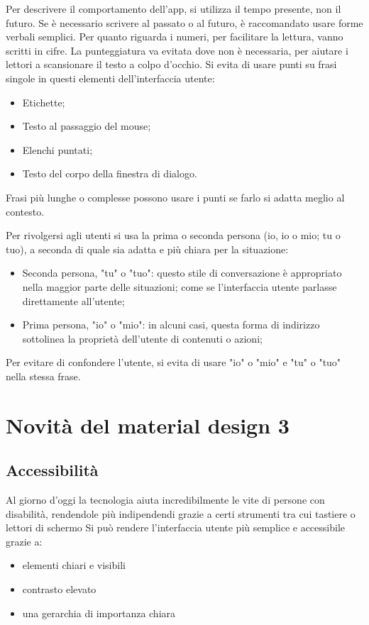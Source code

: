 \documentclass[12pt, a4paper]{report}
\begin{document}
	Per descrivere il comportamento dell’app, si utilizza il tempo presente, non il futuro. Se è necessario scrivere al passato o al futuro, è raccomandato usare forme verbali semplici. Per quanto riguarda i numeri,  per facilitare la lettura, vanno scritti in cifre.
	La punteggiatura va evitata dove non è necessaria, per aiutare i lettori a scansionare il testo a colpo d'occhio. Si evita di usare punti su frasi singole in questi elementi dell'interfaccia utente:
	\begin{itemize}
		\item Etichette;
		\item Testo al passaggio del mouse;
		\item Elenchi puntati;
		\item Testo del corpo della finestra di dialogo.
	\end{itemize}
	Frasi più lunghe o complesse possono usare i punti se farlo si adatta meglio al contesto.

	Per rivolgersi agli utenti si usa la prima o seconda persona (io, io o mio; tu o tuo), a seconda di quale sia adatta e più chiara per la situazione:
	\begin{itemize}
		\item Seconda persona, "tu" o "tuo": questo stile di conversazione è appropriato nella maggior parte delle situazioni; come se l'interfaccia utente parlasse direttamente all'utente;
		\item Prima persona, "io"  o "mio": in alcuni casi, questa forma di indirizzo sottolinea la proprietà dell'utente di contenuti o azioni;
	\end{itemize}
	Per evitare di confondere l'utente, si evita di usare "io" o "mio" e "tu" o "tuo" nella stessa frase.




\chapter{Novità del material design 3}
	\section{Accessibilità}
		Al giorno d'oggi la tecnologia aiuta incredibilmente le vite di persone con disabilità, rendendole più indipendendi grazie a certi strumenti tra cui tastiere o lettori di schermo
		Si può rendere l'interfaccia utente più semplice e accessibile grazie a:
		\begin{itemize}
			\item elementi chiari e visibili
			\item contrasto elevato
			\item una gerarchia di importanza chiara
		\end{itemize}
\end{document}
